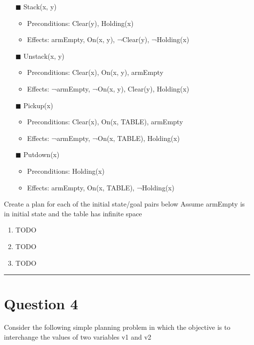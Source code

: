 \documentclass[11pt]{article}
\begin{document}
\begin{flushleft}
\begin{itemize}
    \item[$\blacksquare$] Stack(x, y)
        \begin{itemize}
            \item Preconditions: Clear(y), Holding(x)
            \item Effects: armEmpty, On(x, y), ¬Clear(y), ¬Holding(x)
        \end{itemize}
    \item[$\blacksquare$] Unstack(x, y)
        \begin{itemize}
            \item Preconditions: Clear(x), On(x, y), armEmpty
            \item Effects: ¬armEmpty, ¬On(x, y), Clear(y), Holding(x)
        \end{itemize}
    \item[$\blacksquare$] Pickup(x)
        \begin{itemize}
            \item Preconditions: Clear(x), On(x, TABLE), armEmpty
            \item Effects: ¬armEmpty, ¬On(x, TABLE), Holding(x)
        \end{itemize}
    \item[$\blacksquare$] Putdown(x)
        \begin{itemize}
            \item Preconditions: Holding(x)
            \item Effects: armEmpty, On(x, TABLE), ¬Holding(x)
        \end{itemize}
\end{itemize}

Create a plan for each of the initial state/goal pairs below
Assume armEmpty is in initial state and the table has infinite space

\begin{enumerate}[label=(\alph*)]
\itemsep1em
    \item TODO
    \item TODO
    \item TODO
\end{enumerate}

\rule[0.1pt]{40em}{1.0pt}

\section*{Question 4}
Consider the following simple planning problem in which the objective is to
interchange the values of two variables v1 and v2


\end{flushleft}
\end{document}
